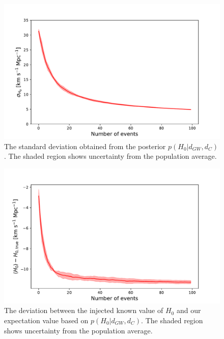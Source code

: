 \begin{figure}
    \centering
    \includegraphics[width=\columnwidth]{figures/std.pdf}
    \caption{The standard deviation obtained from the posterior $p(H_0 | d_{GW}, d_C)$. The shaded region shows uncertainty from the population average.}
    \label{fig:std}
\end{figure}

\begin{figure}
    \centering
    \includegraphics[width=\columnwidth]{figures/diff.pdf}
    \caption{The deviation between the injected known value of $H_0$ and our expectation value based on $p(H_0 | d_{GW}, d_C)$. The shaded region shows uncertainty from the population average.}
    \label{fig:mean_diff}
\end{figure}

